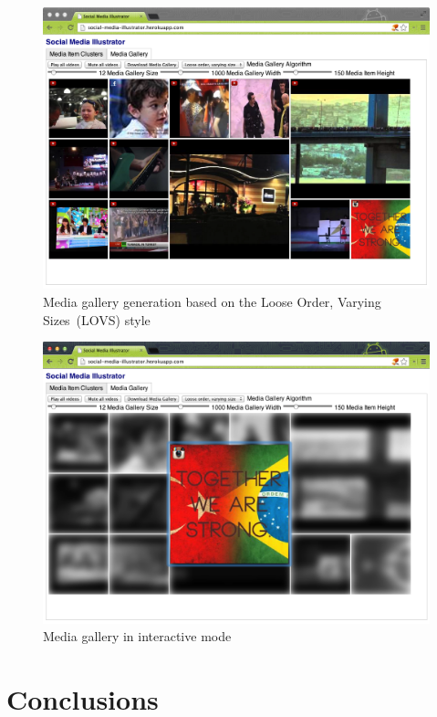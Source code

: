 \begin{figure}[!ht]
  \centering
  \includegraphics[width=1\columnwidth]{app4.png}
  \caption[Media gallery generation based on the Loose Order, Varying Sizes style]{Media gallery generation based on the Loose Order, Varying Sizes~(LOVS) style}
  \label{fig:mediagallerycompilation1}
\end{figure}

\begin{figure}[!ht]
  \centering
  \includegraphics[width=1\columnwidth]{app5.png}
  \caption{Media gallery in interactive mode}
  \label{fig:mediagallerycompilation2}
\end{figure}

\section{Conclusions}

